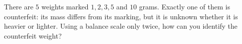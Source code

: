 There are $5$ weights marked $1,2,3,5$ and $10$ grams. Exactly one of them is counterfeit: its mass differs from its marking, but it is unknown whether it is heavier or lighter. Using a balance scale only twice, how can you identify the counterfeit weight?
